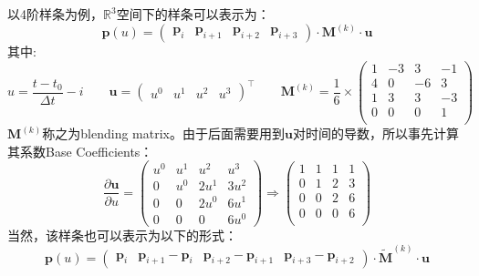 \documentclass[12pt, onecolumn]{article}
\newcommand\normf{\fangsong}
\begin{document}
	\section{\normf{样条解析求导}}
	以4阶样条为例，$\mathbb{R}^3$空间下的样条可以表示为：
	\begin{equation}
	\boldsymbol{p}(u)=\begin{pmatrix}
	\boldsymbol{p}_i&\boldsymbol{p}_{i+1}&\boldsymbol{p}_{i+2}&\boldsymbol{p}_{i+3}
	\end{pmatrix}\cdot\boldsymbol{M}^{(k)}\cdot\boldsymbol{u}
	\end{equation}
	其中:
	\begin{equation}
	u=\frac{t-t_0}{\Delta t}-i\qquad\boldsymbol{u}=\begin{pmatrix}
	u^0&u^1&u^2&u^3
	\end{pmatrix}^\top\qquad\boldsymbol{M}^{(k)}=\frac{1}{6}\times\begin{pmatrix}
	 1 &-3 & 3& -1\\
	 4 & 0 &-6&  3\\
	 1 & 3 & 3& -3\\
	 0 & 0 & 0&  1\\
	\end{pmatrix}
	\end{equation}
	$\boldsymbol{M}^{(k)}$称之为blending matrix。由于后面需要用到$\boldsymbol{u}$对时间的导数，所以事先计算其系数Base Coefficients：
	\begin{equation}
	\frac{\partial \boldsymbol{u}}{\partial u}=\begin{pmatrix}
	u^0&u^1&u^2&u^3\\
	0&u^0&2u^1&3u^2\\
	0&0&2u^0&6u^1\\
	0&0&0&6u^0
	\end{pmatrix}\Rightarrow\begin{pmatrix}
	1& 1& 1& 1\\
	0& 1& 2& 3\\
	0& 0& 2& 6\\
	0& 0& 0& 6\\
	\end{pmatrix}
	\end{equation}
	当然，该样条也可以表示为以下的形式：
	\begin{equation}
	\boldsymbol{p}(u)=\begin{pmatrix}
	\boldsymbol{p}_i&\boldsymbol{p}_{i+1}-\boldsymbol{p}_i&\boldsymbol{p}_{i+2}-\boldsymbol{p}_{i+1}&\boldsymbol{p}_{i+3}-\boldsymbol{p}_{i+2}
	\end{pmatrix}\cdot\boldsymbol{\widetilde{M}}^{(k)}\cdot\boldsymbol{u}
	\end{equation}
\end{document}
